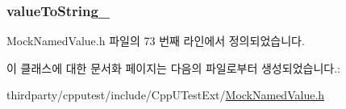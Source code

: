\subsubsection[{\texorpdfstring{value\+To\+String\+\_\+}{valueToString_}}]{ value\+To\+String\+\_\+\hspace{0.3cm}{\ttfamily [private]}}\hypertarget{class_mock_function_comparator_a940ae12554fd71daa4feffe21fbbddbf}{}\label{class_mock_function_comparator_a940ae12554fd71daa4feffe21fbbddbf}


Mock\+Named\+Value.\+h 파일의 73 번째 라인에서 정의되었습니다.



이 클래스에 대한 문서화 페이지는 다음의 파일로부터 생성되었습니다.\+:\begin{DoxyCompactItemize}
\item 
thirdparty/cpputest/include/\+Cpp\+U\+Test\+Ext/\hyperlink{_mock_named_value_8h}{Mock\+Named\+Value.\+h}\end{DoxyCompactItemize}
